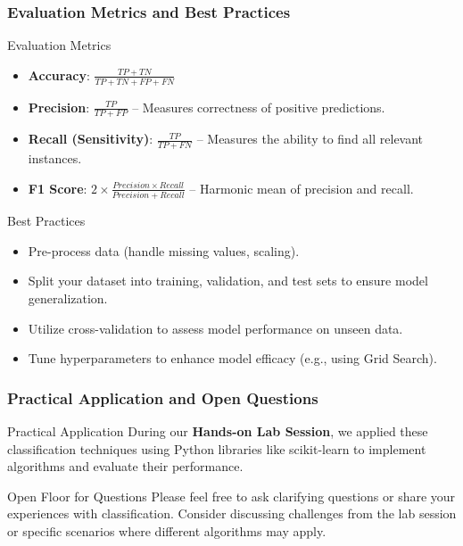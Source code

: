 \documentclass[aspectratio=169]{beamer}
\begin{document}
\begin{frame}[fragile]
    \frametitle{Evaluation Metrics and Best Practices}

    \begin{block}{Evaluation Metrics}
        \begin{itemize}
            \item \textbf{Accuracy}: \( \frac{TP + TN}{TP + TN + FP + FN} \)
            \item \textbf{Precision}: \( \frac{TP}{TP + FP} \) – Measures correctness of positive predictions.
            \item \textbf{Recall (Sensitivity)}: \( \frac{TP}{TP + FN} \) – Measures the ability to find all relevant instances.
            \item \textbf{F1 Score}: \( 2 \times \frac{Precision \times Recall}{Precision + Recall} \) – Harmonic mean of precision and recall.
        \end{itemize}
    \end{block}

    \begin{block}{Best Practices}
        \begin{itemize}
            \item Pre-process data (handle missing values, scaling).
            \item Split your dataset into training, validation, and test sets to ensure model generalization.
            \item Utilize cross-validation to assess model performance on unseen data.
            \item Tune hyperparameters to enhance model efficacy (e.g., using Grid Search).
        \end{itemize}
    \end{block}
\end{frame}

\begin{frame}[fragile]
    \frametitle{Practical Application and Open Questions}

    \begin{block}{Practical Application}
        During our \textbf{Hands-on Lab Session}, we applied these classification techniques using Python libraries like scikit-learn to implement algorithms and evaluate their performance.
    \end{block}

    \begin{block}{Open Floor for Questions}
        Please feel free to ask clarifying questions or share your experiences with classification. Consider discussing challenges from the lab session or specific scenarios where different algorithms may apply.
    \end{block}
\end{frame}
\end{document}
